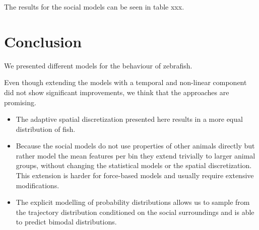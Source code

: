 \documentclass[nobib]{tufte-handout}
\begin{document}
The results for the social models can be seen in table xxx.


\section{Conclusion}
We presented different models for the behaviour of zebrafish.

Even though extending the models with a temporal and non-linear component did not show significant improvements, we think that the approaches are promising.
\begin{itemize}
\item The adaptive spatial discretization presented here results in a more equal distribution of fish.
\item Because the social models do not use properties of other animals directly but rather model the mean features per bin they extend trivially to larger animal groups, without changing the statistical models or the spatial discretization.
  This extension is harder for force-based models and usually require extensive modifications.
\item The explicit modelling of probability distributions allows us to sample from the trajectory distribution conditioned on the social surroundings and is able to predict bimodal distributions.
\end{itemize}

\printbibliography
\end{document}
